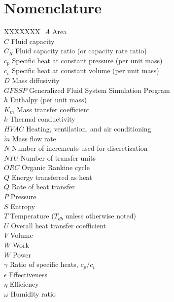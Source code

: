 \documentclass[]{article}
\begin{document}
\section*{Nomenclature}

\begin{tabbing}
  XXXXXXX \= \kill%
  $A$ \> Area \\
  $C$ \> Fluid capacity\\
  $C_R$ \>Fluid capacity ratio  (or capacity rate ratio)\\  
  $c_p$ \> Specific heat at constant pressure  (per unit mass)\\
  $c_v$ \> Specific heat at constant volume  (per unit mass)\\
  $D$ \> Mass diffusivity\\
  $GFSSP$ \> Generalized Fluid System Simulation Program \\
  $h$ \> Enthalpy (per unit mass)\\
  $K_m$ \> Mass transfer coefficient\\
  $k$ \> Thermal conductivity\\

  $HVAC$ \> Heating, ventilation, and air conditioning \\
  $\dot{m}$ \> Mass flow rate \\
  $N$ \> Number of increments used for discretization\\
  $NTU$ \> Number of transfer units \\
  $ORC$ \> Organic Rankine cycle \\
  $Q$ \> Energy transferred as heat \\
  $\dot{Q}$ \> Rate of heat transfer \\
  $P$ \> Pressure \\
  $S$ \> Entropy \\
  $T$ \> Temperature ($T_{db}$ unless otherwise noted) \\
  $U$ \> Overall heat transfer coefficient \\
  $V$ \> Volume \\
  $W$ \> Work \\
  $\dot{W}$ \> Power\\
  
  $\gamma$ \> Ratio of specific heats, $c_p/c_v$ \\
  $\epsilon$ \> Effectiveness \\
  $\eta$ \> Efficiency \\  
  $\omega$ \> Humidity ratio\\\\[5pt]
  

\end{tabbing}
\end{document}
